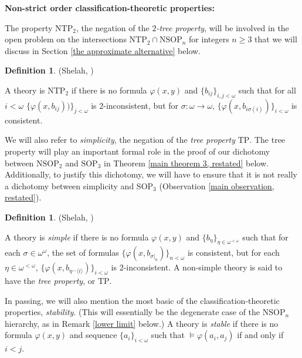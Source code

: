 \documentclass{amsart}
\theoremstyle{definition}
\newtheorem{definition}[theorem]{Definition}
\theoremstyle{remark}
\numberwithin{equation}{section}
\begin{document}
\textbf{Non-strict order classification-theoretic properties:}

The property $\mathrm{NTP}_{2}$, the negation of the \textit{$2$-tree property}, will be involved in the open problem on the intersections $\mathrm{NTP}_{2} \cap \mathrm{NSOP}_{n}$ for integers $n \geq 3$ that we will discuss in Section \ref{the approximate alternative} below.

\begin{definition}\label{ntp_2 definition}(Shelah, \cite{Sh90})

A theory is $\mathrm{NTP}_{2}$ if there is no formula $\varphi(x, y)$ and $\{b_{ij}\}_{i, j < \omega}$ such that for all $i< \omega$ $\{\varphi(x, b_{ij}))\}_{j < \omega}$ is $2$-inconsistent, but for $\sigma: \omega \to \omega$, $\{\varphi(x, b_{i\sigma(i)})\}_{i < \omega}$ is consistent.
    
\end{definition}


We will also refer to \textit{simplicity}, the negation of the \textit{tree property} $\mathrm{TP}$. The tree property will play an important formal role in the proof of our dichotomy between $\mathrm{NSOP}_{2}$ and $\mathrm{SOP}_{3}$ in Theorem \ref{main theorem 3, restated} below. Additionally, to justify this dichotomy, we will have to ensure that it is not really a dichotomy between simplicity and $\mathrm{SOP}_{3}$ (Observation \ref{main observation, restated}).

\begin{definition}\label{simplicity definition} (Shelah, \cite{Sh90})

A theory is \textit{simple} if there is no formula $\varphi(x, y)$ and $\{b_{\eta}\}_{\eta \in \omega^{< \omega}}$ such that for each $\sigma \in\omega^{\omega}$, the set of formulas $\{\varphi(x,b_{\sigma|_n})\}_{n < \omega}$ is consistent, but for each $\eta\in\omega^{<\omega}$, $\{\varphi(x,b_{\eta^\smallfrown \langle i \rangle})\}_{i < \omega}$ is $2$-inconsistent. A non-simple theory is said to have the \textit{tree property}, or $\mathrm{TP}$.
    
\end{definition}

In passing, we will also mention the most basic of the classification-theoretic properties, \textit{stability}. (This will essentially be the degenerate case of the $\mathrm{NSOP}_{n}$ hierarchy, as in Remark \ref{lower limit} below.) A theory is \textit{stable} if there is no formula $\varphi(x, y)$ and sequence $\{a_{i}\}_{i < \omega}$ such that $\models \varphi(a_{i}, a_{j})$ if and only if $i < j$.
\end{document}
